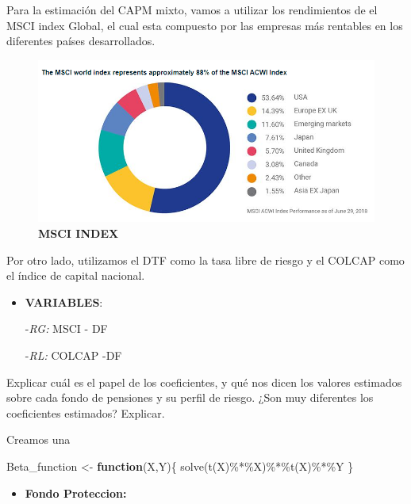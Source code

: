 \documentclass[
  12pt,
]{article}
\newenvironment{Shaded}{\begin{snugshade}}{\end{snugshade}}
\newcommand{\ControlFlowTok}[1]{\textcolor[rgb]{0.13,0.29,0.53}{\textbf{#1}}}
\newcommand{\FunctionTok}[1]{\textcolor[rgb]{0.00,0.00,0.00}{#1}}
\newcommand{\NormalTok}[1]{#1}
\newcommand{\OtherTok}[1]{\textcolor[rgb]{0.56,0.35,0.01}{#1}}
\newcommand{\SpecialCharTok}[1]{\textcolor[rgb]{0.00,0.00,0.00}{#1}}
\providecommand{\tightlist}{%
  \setlength{\itemsep}{0pt}\setlength{\parskip}{0pt}}
\begin{document}
Para la estimación del CAPM mixto, vamos a utilizar los rendimientos de
el MSCI index Global, el cual esta compuesto por las empresas más
rentables en los diferentes países desarrollados.

\begin{figure}
\centering
\includegraphics{index.png}
\caption{\textbf{MSCI INDEX}}
\end{figure}

Por otro lado, utilizamos el DTF como la tasa libre de riesgo y el
COLCAP como el índice de capital nacional.

\begin{itemize}
\item
  \textbf{VARIABLES}:

  -\emph{RG:} MSCI - DF

  -\emph{RL:} COLCAP -DF
\end{itemize}

Explicar cuál es el papel de los coeficientes, y qué nos dicen los
valores estimados sobre cada fondo de pensiones y su perfil de riesgo.
¿Son muy diferentes los coeficientes estimados? Explicar.

Creamos una

\begin{Shaded}
\begin{Highlighting}[]
\NormalTok{Beta\_function }\OtherTok{\textless{}{-}} \ControlFlowTok{function}\NormalTok{(X,Y)\{}
  \FunctionTok{solve}\NormalTok{(}\FunctionTok{t}\NormalTok{(X)}\SpecialCharTok{\%*\%}\NormalTok{X)}\SpecialCharTok{\%*\%}\FunctionTok{t}\NormalTok{(X)}\SpecialCharTok{\%*\%}\NormalTok{Y}
\NormalTok{\} }
\end{Highlighting}
\end{Shaded}

\begin{itemize}
\tightlist
\item
  \textbf{Fondo Proteccion:}
\end{itemize}
\end{document}
